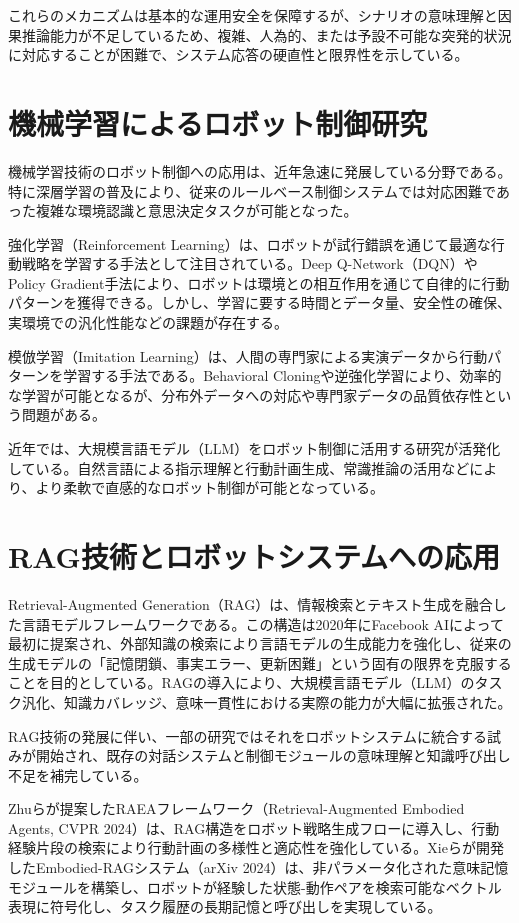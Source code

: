 \documentclass[12pt]{report}
\begin{document}
これらのメカニズムは基本的な運用安全を保障するが、シナリオの意味理解と因果推論能力が不足しているため、複雑、人為的、または予設不可能な突発的状況に対応することが困難で、システム応答の硬直性と限界性を示している。

\section{機械学習によるロボット制御研究}
\label{sec:ml_robotics}

機械学習技術のロボット制御への応用は、近年急速に発展している分野である。特に深層学習の普及により、従来のルールベース制御システムでは対応困難であった複雑な環境認識と意思決定タスクが可能となった。

強化学習（Reinforcement Learning）は、ロボットが試行錯誤を通じて最適な行動戦略を学習する手法として注目されている。Deep Q-Network（DQN）やPolicy Gradient手法により、ロボットは環境との相互作用を通じて自律的に行動パターンを獲得できる。しかし、学習に要する時間とデータ量、安全性の確保、実環境での汎化性能などの課題が存在する。

模倣学習（Imitation Learning）は、人間の専門家による実演データから行動パターンを学習する手法である。Behavioral Cloningや逆強化学習により、効率的な学習が可能となるが、分布外データへの対応や専門家データの品質依存性という問題がある。

近年では、大規模言語モデル（LLM）をロボット制御に活用する研究が活発化している。自然言語による指示理解と行動計画生成、常識推論の活用などにより、より柔軟で直感的なロボット制御が可能となっている。

\section{RAG技術とロボットシステムへの応用}
\label{sec:rag_applications}

Retrieval-Augmented Generation（RAG）は、情報検索とテキスト生成を融合した言語モデルフレームワークである。この構造は2020年にFacebook AIによって最初に提案され、外部知識の検索により言語モデルの生成能力を強化し、従来の生成モデルの「記憶閉鎖、事実エラー、更新困難」という固有の限界を克服することを目的としている。RAGの導入により、大規模言語モデル（LLM）のタスク汎化、知識カバレッジ、意味一貫性における実際の能力が大幅に拡張された。

RAG技術の発展に伴い、一部の研究ではそれをロボットシステムに統合する試みが開始され、既存の対話システムと制御モジュールの意味理解と知識呼び出し不足を補完している。

Zhuらが提案したRAEAフレームワーク（Retrieval-Augmented Embodied Agents, CVPR 2024）は、RAG構造をロボット戦略生成フローに導入し、行動経験片段の検索により行動計画の多様性と適応性を強化している。Xieらが開発したEmbodied-RAGシステム（arXiv 2024）は、非パラメータ化された意味記憶モジュールを構築し、ロボットが経験した状態-動作ペアを検索可能なベクトル表現に符号化し、タスク履歴の長期記憶と呼び出しを実現している。
\end{document}
